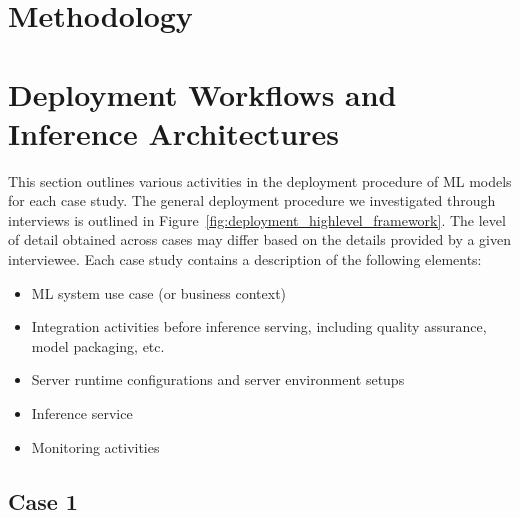 \documentclass[manuscript,screen,review]{acmart}
\begin{document}


\section{Methodology}
\label{sec: methodology}


\section{Deployment Workflows and Inference Architectures}
\label{sec: cases}
This section outlines various activities in the deployment procedure of ML models for each case study. The general deployment procedure we investigated through interviews is outlined in Figure~\ref{fig:deployment_highlevel_framework}. The level of detail obtained across cases may differ based on the details provided by a given interviewee. Each case study contains a description of the following elements:
\begin{itemize}
    \item ML system use case (or business context)
    \item Integration activities before inference serving, including quality assurance, model packaging, etc. 
    \item Server runtime configurations and server environment setups
    \item Inference service 
    \item Monitoring activities 
\end{itemize}  



\subsection*{Case 1}\label{1}

\end{document}
